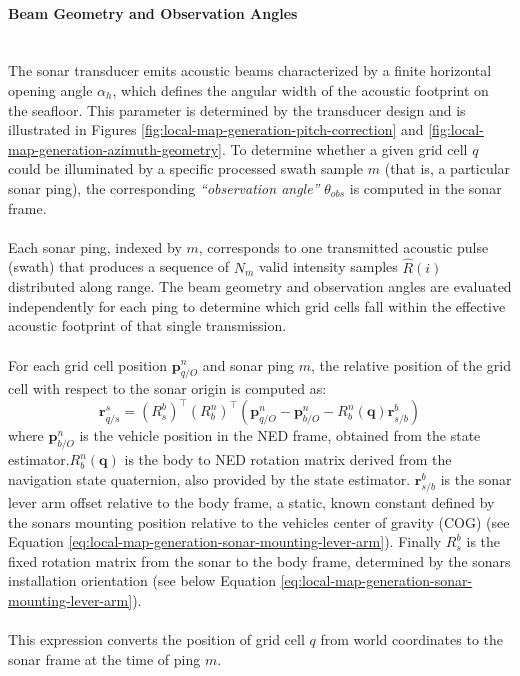 \paragraph{Beam Geometry and Observation Angles} \mbox{}\\[0.5em] \noindent
The sonar transducer emits acoustic beams characterized by a finite horizontal opening angle $\alpha_h$, which defines the angular width of the acoustic footprint on the seafloor. This parameter is determined by the transducer design and is illustrated in Figures \ref{fig:local-map-generation-pitch-correction} and \ref{fig:local-map-generation-azimuth-geometry}.  
To determine whether a given grid cell $q$ could be illuminated by a specific processed swath sample $m$ (that is, a particular sonar ping), the corresponding \textit{``observation angle''} $\theta_{obs}$ is computed in the sonar frame.
\\ \\
Each sonar ping, indexed by $m$, corresponds to one transmitted acoustic pulse (swath) that produces a sequence of $N_m$ valid intensity samples $\hat{R}(i)$ distributed along range. The beam geometry and observation angles are evaluated independently for each ping to determine which grid cells fall within the effective acoustic footprint of that single transmission.
\\ \\
For each grid cell position $\mathbf{p}_{q/O}^{n}$ and sonar ping $m$, the relative position of the grid cell with respect to the sonar origin is computed as:
$$
    \mathbf{r}_{q/s}^{s} = (R_s^b)^\top (R_b^n)^\top 
    \left(
        \mathbf{p}_{q/O}^{n}
        - \mathbf{p}_{b/O}^{n}
        - R_b^n(\mathbf{q}) \mathbf{r}_{s/b}^{b}
    \right)
$$
where $\mathbf{p}_{b/O}^{n}$ is the vehicle position in the NED frame, obtained from the state estimator.$R_b^n(\mathbf{q})$ is the body to NED rotation matrix derived from the navigation state quaternion, also provided by the state estimator. $\mathbf{r}_{s/b}^{b}$ is the sonar lever arm offset relative to the body frame, a static, known constant defined by the sonars mounting position relative to the vehicles center of gravity (COG) (see Equation \ref{eq:local-map-generation-sonar-mounting-lever-arm}). Finally $R_s^b$ is the fixed rotation matrix from the sonar to the body frame, determined by the sonars installation orientation (see below Equation \ref{eq:local-map-generation-sonar-mounting-lever-arm}).
\\ \\
This expression converts the position of grid cell $q$ from world coordinates to the sonar frame at the time of ping $m$.  

